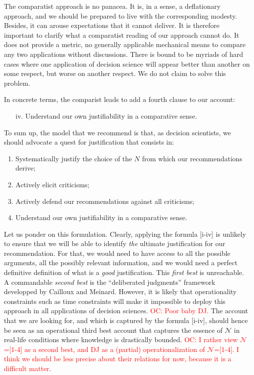 \documentclass[preprint, french, english, 11pt, authoryear]{elsarticle}%
\newcommand{\commentOC}[1]{\textcolor{red}{OC: #1}}
\newcommand{\adv}{\mathscr{N}}
\begin{document}
The comparatist approach is no panacea. It is, in a sense, a deflationary approach, and we should be prepared to live with the corresponding modesty. 
Besides, it can arouse expectations that it cannot deliver. It is therefore important to clarify what a comparatist reading of our approach cannot do. It does not provide a metric, no generally applicable mechanical means to compare any two applications without discussions. There is bound to be myriads of hard cases where one application of decision science will appear better than another on some respect, but worse on another respect. We do not claim to solve this problem.

In concrete terms, the comparist leads to add a fourth clause to our account:
\begin{itemize}
\item[iv.]	Understand our own justifiability in a comparative sense.
\end{itemize}

To sum up, the model that we recommend is that, as decision scientists, we should advocate a quest for justification that consists in:
\begin{enumerate}[label=\roman*.]
	\item Systematically justify the choice of the $N$ from which our recommendations derive;
	\item Actively elicit criticisms;
	\item Actively defend our recommendations against all criticisms;
	\item Understand our own justifiability in a comparative sense.
\end{enumerate}

Let us ponder on this formulation. Clearly, applying the formula [i-iv] is unlikely to ensure that we will be able to identify \emph{the} ultimate justification for our recommendation. For that, we would need to have access to all the possible arguments, all the possibly relevant information, and we would need a perfect definitive definition of what is a \emph{good} justification. This \emph{first best} is unreachable. A commandable \emph{second best} is the “deliberated judgments” framework developped by Cailloux and Meinard. However, it is likely that operationality constraints such as time constraints will make it impossible to deploy this approach in all applications of decision sciences. \commentOC{Poor baby DJ.} The account that we are looking for, and which is captured by the formula [i-iv], should hence be seen as an operational third best account that captures the essence of $\adv$ in real-life conditions where knowledge is drastically bounded. \commentOC{I rather view $\adv$=[1-4] as a second best, and DJ as a (partial) operationalization of $\adv$=[1-4]. I think we should be less precise about their relations for now, because it is a difficult matter.}
\end{document}
